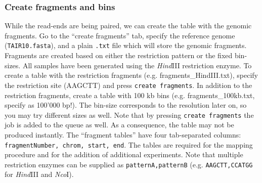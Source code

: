 \documentclass[a4paper,10pt]{article}
\begin{document}
\subsubsection{Create fragments and bins}\label{fragTab}
While the read-ends are being paired, we can create the table with the genomic fragments. Go to the ``create fragments'' tab, specify the reference genome (\texttt{TAIR10.fasta}), and a plain \texttt{.txt} file which will store the genomic fragments. Fragments are created based on either the restriction pattern or the fixed bin-sizes. All samples have been generated using the \textit{Hind}III restriction enzyme. To create a table with the restriction fragments (e.g. fragments\_HindIII.txt), specify the restriction site (AAGCTT) and press \texttt{create fragments}. In addition to the restriction fragments, create a table with 100 kb bins (e.g. fragments\_100kb.txt, specify as 100'000 bp!). The bin-size corresponds to the resolution later on, so you may try different sizes as well. Note that by pressing \texttt{create fragments} the job is added to the queue as well. As a consequence, the table may not be produced instantly. 
\newline
\newline
The ``fragment tables'' have four tab-separated columns: \texttt{fragmentNumber, chrom, start, end}. The tables are required for the mapping procedure and for the addition of additional experiments. Note that multiple restriction enzymes can be supplied as \texttt{patternA,patternB} (e.g. \texttt{AAGCTT,CCATGG} for \textit{Hind}III and \textit{Nco}I). 
\end{document}
